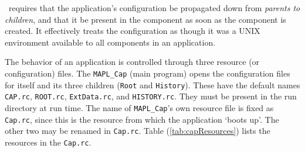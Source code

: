 \ggn\ requires that the application's configuration
be propagated down from \emph{parents to children}, and that it be
present in the component as soon as the component is created. It
effectively treats the configuration as though it was a UNIX environment
available to all components in an application.

The behavior of an application is controlled through three resource (or
configuration) files. The \texttt{MAPL\_Cap} (main program) opens the
configuration files for itself and its three children
(\texttt{Root} and \texttt{History}). These have the default names
\texttt{CAP.rc}, \texttt{ROOT.rc}, \texttt{ExtData.rc}, and \texttt{HISTORY.rc}. They must be
present in the run directory at run time. The name of \texttt{MAPL\_Cap}'s
own resource file is fixed as \texttt{Cap.rc}, since this is the resource
from which the application `boots up'. The other two may be renamed in
\texttt{Cap.rc}. Table (\ref{tab:capResources}) lists the resources
in the \texttt{Cap.rc}.\\

